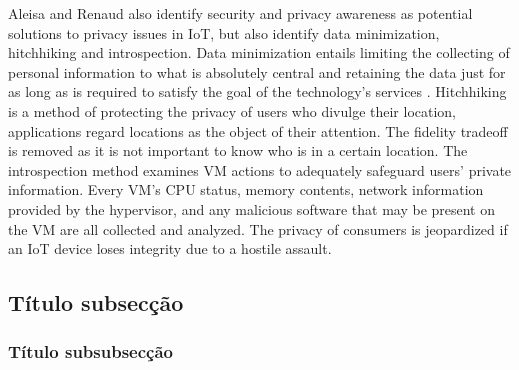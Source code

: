 Aleisa and Renaud \cite{aleisa2016privacy} also identify security and privacy
awareness as potential solutions to privacy issues in IoT, but also identify
data minimization, hitchhiking and introspection. Data minimization entails
limiting the collecting of personal information to what is absolutely central
and retaining the data just for as long as is required to satisfy the goal
of the technology's services \cite{ojDirective281}. Hitchhiking \cite{tang2006putting}
is a method of protecting the privacy of users who divulge their location,
applications regard locations as the object of their attention. The fidelity
tradeoff is removed as it is not important to know who is in a certain
location. The introspection \cite{kang2015protection} method examines VM
actions to adequately safeguard users' private information. Every VM's
CPU status, memory contents, network information provided by the hypervisor,
and any malicious software that may be present on the VM are all collected
and analyzed. The privacy of consumers is jeopardized if an IoT device
loses integrity due to a hostile assault.

\subsection{Título subsecção}

\subsubsection{Título subsubsecção}

